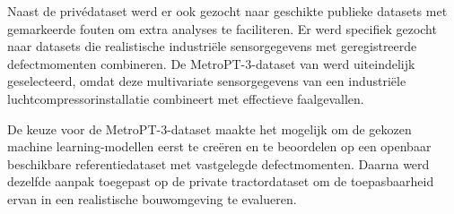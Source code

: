 Naast de privédataset werd er ook gezocht naar geschikte publieke datasets met gemarkeerde fouten om extra analyses te faciliteren. Er werd specifiek gezocht naar datasets die realistische industriële sensorgegevens met geregistreerde defectmomenten combineren. De MetroPT-3-dataset van \textcite{Veloso2022} werd uiteindelijk geselecteerd, omdat deze multivariate sensorgegevens van een industriële luchtcompressorinstallatie combineert met effectieve faalgevallen.

De keuze voor de MetroPT-3-dataset maakte het mogelijk om de gekozen machine learning-modellen eerst te creëren en te beoordelen op een openbaar beschikbare referentiedataset met vastgelegde defectmomenten. Daarna werd dezelfde aanpak toegepast op de private tractordataset om de toepasbaarheid ervan in een realistische bouwomgeving te evalueren.




